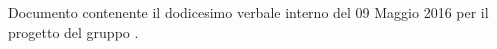 Documento contenente il dodicesimo verbale interno del 09 Maggio 2016 per il progetto \progetto{} del gruppo \gruppo{}.
